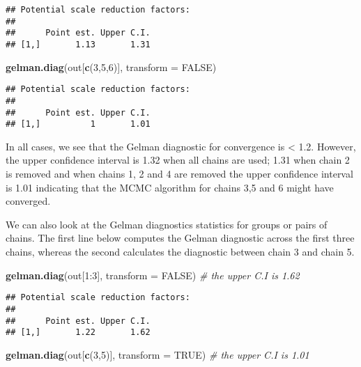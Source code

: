 \documentclass[]{article}
\newenvironment{Shaded}{\begin{snugshade}}{\end{snugshade}}
\newcommand{\KeywordTok}[1]{\textcolor[rgb]{0.13,0.29,0.53}{\textbf{{#1}}}}
\newcommand{\DataTypeTok}[1]{\textcolor[rgb]{0.13,0.29,0.53}{{#1}}}
\newcommand{\DecValTok}[1]{\textcolor[rgb]{0.00,0.00,0.81}{{#1}}}
\newcommand{\CommentTok}[1]{\textcolor[rgb]{0.56,0.35,0.01}{\textit{{#1}}}}
\newcommand{\OtherTok}[1]{\textcolor[rgb]{0.56,0.35,0.01}{{#1}}}
\newcommand{\NormalTok}[1]{{#1}}
\begin{document}
\begin{verbatim}
## Potential scale reduction factors:
## 
##      Point est. Upper C.I.
## [1,]       1.13       1.31
\end{verbatim}

\begin{Shaded}
\begin{Highlighting}[]
\KeywordTok{gelman.diag}\NormalTok{(out[}\KeywordTok{c}\NormalTok{(}\DecValTok{3}\NormalTok{,}\DecValTok{5}\NormalTok{,}\DecValTok{6}\NormalTok{)], }\DataTypeTok{transform =} \OtherTok{FALSE}\NormalTok{)}
\end{Highlighting}
\end{Shaded}

\begin{verbatim}
## Potential scale reduction factors:
## 
##      Point est. Upper C.I.
## [1,]          1       1.01
\end{verbatim}

In all cases, we see that the Gelman diagnostic for convergence is
\textless{} 1.2. However, the upper confidence interval is 1.32 when all
chains are used; 1.31 when chain 2 is removed and when chains 1, 2 and 4
are removed the upper confidence interval is 1.01 indicating that the
MCMC algorithm for chains 3,5 and 6 might have converged.

We can also look at the Gelman diagnostics statistics for groups or
pairs of chains. The first line below computes the Gelman diagnostic
across the first three chains, whereas the second calculates the
diagnostic between chain 3 and chain 5.

\begin{Shaded}
\begin{Highlighting}[]
\KeywordTok{gelman.diag}\NormalTok{(out[}\DecValTok{1}\NormalTok{:}\DecValTok{3}\NormalTok{], }\DataTypeTok{transform =} \OtherTok{FALSE}\NormalTok{) }\CommentTok{# the upper C.I is 1.62}
\end{Highlighting}
\end{Shaded}

\begin{verbatim}
## Potential scale reduction factors:
## 
##      Point est. Upper C.I.
## [1,]       1.22       1.62
\end{verbatim}

\begin{Shaded}
\begin{Highlighting}[]
\KeywordTok{gelman.diag}\NormalTok{(out[}\KeywordTok{c}\NormalTok{(}\DecValTok{3}\NormalTok{,}\DecValTok{5}\NormalTok{)], }\DataTypeTok{transform =} \OtherTok{TRUE}\NormalTok{) }\CommentTok{# the upper C.I is 1.01}
\end{Highlighting}
\end{Shaded}
\end{document}
